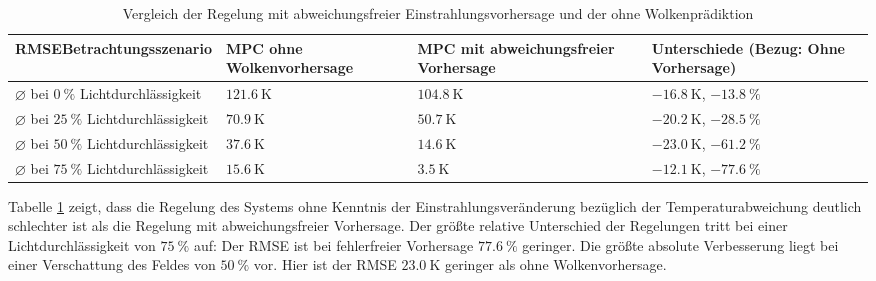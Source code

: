 \begingroup
\renewcommand{\arraystretch}{1.2}
\begin{table}[ht!]
    \caption[Vergleich der Regelung mit abweichungsfreier Einstrahlungsvorhersage und der ohne Wolkenprädiktion]{Vergleich der Regelung mit abweichungsfreier Einstrahlungsvorhersage und der ohne Wolkenprädiktion}
    \centering
    \begin{tabular}{>{\centering\arraybackslash}m{}>{\centering\arraybackslash}m{}>{\centering\arraybackslash}m{}>{\centering\arraybackslash}m{}}
        \rowcolor{white}
        \toprule
        RMSE\linebreak Betrachtungsszenario                      & MPC ohne Wolkenvorhersage & MPC mit abweichungsfreier Vorhersage & Unterschiede (Bezug: Ohne Vorhersage)         \\
        \midrule
        $\diameter$ bei $\SI{0}{\percent}$ Lichtdurchlässigkeit  & $\SI{121.6}{\kelvin}$     & $\SI{104.8}{\kelvin}$                & $\SI{-16.8}{\kelvin}$, $\SI{-13.8}{\percent}$ \\
        $\diameter$ bei $\SI{25}{\percent}$ Lichtdurchlässigkeit & $\SI{70.9}{\kelvin}$      & $\SI{50.7}{\kelvin}$                 & $\SI{-20.2}{\kelvin}$, $\SI{-28.5}{\percent}$ \\
        $\diameter$ bei $\SI{50}{\percent}$ Lichtdurchlässigkeit & $\SI{37.6}{\kelvin}$      & $\SI{14.6}{\kelvin}$                 & $\SI{-23.0}{\kelvin}$, $\SI{-61.2}{\percent}$ \\
        $\diameter$ bei $\SI{75}{\percent}$ Lichtdurchlässigkeit & $\SI{15.6}{\kelvin}$      & $\SI{3.5}{\kelvin}$                  & $\SI{-12.1}{\kelvin}$, $\SI{-77.6}{\percent}$ \\
        \toprule
    \end{tabular}
    \label{tab_Vergleich2}
\end{table}
\endgroup

Tabelle \ref{tab_Vergleich2} zeigt, dass die Regelung des Systems ohne Kenntnis der Einstrahlungsveränderung bezüglich der Temperaturabweichung deutlich schlechter ist als die Regelung mit abweichungsfreier Vorhersage.
Der größte relative Unterschied der Regelungen tritt bei einer Lichtdurchlässigkeit von $\SI{75}{\percent}$ auf: Der RMSE ist bei fehlerfreier Vorhersage $\SI{77.6}{\percent}$ geringer.
Die größte absolute Verbesserung liegt bei einer Verschattung des Feldes von $\SI{50}{\percent}$ vor.
Hier ist der RMSE $\SI{23.0}{\kelvin}$ geringer als ohne Wolkenvorhersage.

